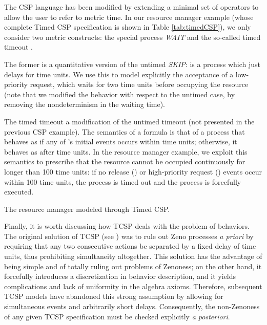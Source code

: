 \begin{example}
The CSP language has been modified \cite{DS95,Sch00} by extending a minimal set of operators to allow 
the user to refer to metric time. In our resource manager 
example (whose complete Timed CSP specification is shown in Table \ref{tab:timedCSP}), 
we only consider two metric constructs: the special process \textsl{WAIT}
and the so-called timed timeout .

The former is a quantitative version of the untimed \textsl{SKIP}: 
is a process which just delays for  time units. We use this 
to model explicitly the acceptance of a low-priority request, 
which waits for two time units before occupying the resource 
(note that we modified the behavior with respect to the untimed 
case, by removing the nondeterminism in the waiting time).

The timed timeout  a modification of the untimed timeout
 (not presented in the previous CSP example). The semantics of a
formula  is that of a process that
behaves as  if any of 's initial events occurs
within  time units; otherwise, it behaves as  after 
time units. In the resource manager example, we exploit this semantics
to prescribe that the resource cannot be occupied continuously for
longer than 100 time units: if no release () or high-priority
request () events occur within 100 time units, the process
 is timed out and the process  is
forcefully executed.
\begin{table}[tbh]
\begin{center}

\end{center}
\caption{The resource manager modeled through Timed CSP.}
\label{tab:timedCSP}
\end{table}
\end{example}

Finally, it is worth discussing how TCSP deals with the problem 
of  behaviors. The original solution of TCSP (see \cite{DS95}) 
was to rule out Zeno processes \emph{a priori} by requiring that 
any two consecutive actions be separated by a fixed delay of 
time units, thus prohibiting simultaneity altogether. This solution 
has the advantage of being simple and of totally ruling out problems 
of Zenoness; on the other hand, it forcefully introduces a discretization 
in behavior description, and it yields complications and lack of uniformity 
in the algebra axioms. Therefore, subsequent TCSP models have 
abandoned this strong assumption by allowing for simultaneous 
events and arbitrarily short delays. Consequently, the non-Zenoness 
of any given TCSP specification must be checked explicitly \emph{a posteriori}.

